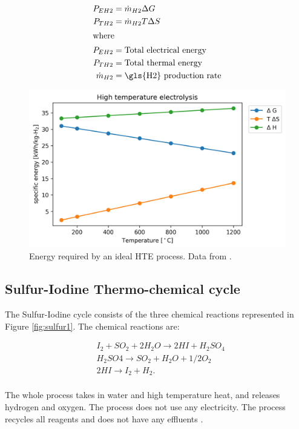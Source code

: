 \documentclass[11pt,letterpaper]{article}
\begin{document}
\begin{align}
	P_{EH2} &= \dot{m}_{H2} \Delta G\\
	P_{TH2} &= \dot{m}_{H2} T \Delta S\\
	\label{eq:electrolysis2}

	\intertext{where}
	P_{EH2} &= \mbox{Total electrical energy} \\
	P_{TH2} &= \mbox{Total thermal energy} \\
	\dot{m}_{H2} &= \mbox{\gls{H2} production rate} \\
\end{align}

\begin{figure}[htbp!]
	\centering
	\includegraphics[width=0.7\linewidth]{figures/hte-energy.png}
	\hfill
	\caption{Energy required by an ideal \gls{HTE} process. Data from \cite{yildiz_efficiency_2006}.}
	\label{fig:electro1}
\end{figure}

\subsection{Sulfur-Iodine Thermo-chemical cycle}

The Sulfur-Iodine cycle consists of the three chemical reactions represented in Figure \ref{fig:sulfur1}.
The chemical reactions are:

\begin{align}
	& I_2 + SO_2 + 2H_2O \rightarrow 2HI + H_2SO_4 \\
\label{eq:sulfur1}

	& H_2SO4 \rightarrow SO_2 + H_2O + 1/2O_2 \\
\label{eq:sulfur2}

	& 2HI \rightarrow I_2 + H_2. \\
\label{eq:sulfur3}
\end{align}

The whole process takes in water and high temperature heat, and releases hydrogen and oxygen.
The process does not use any electricity.
The process recycles all reagents and does not have any effluents \cite{yildiz_efficiency_2006}.
\end{document}

